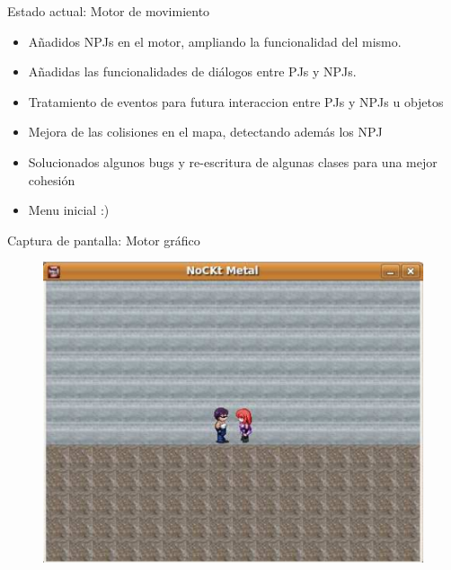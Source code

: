 \documentclass[9pt,xcolor=svgnames]{beamer}
\begin{document}
   \begin{frame}{Estado actual: Motor de movimiento}
   \transdissolve

    \begin{itemize}
     \item Añadidos NPJs en el motor, ampliando la funcionalidad del mismo.
     \item Añadidas las funcionalidades de diálogos entre PJs y NPJs.
     \item Tratamiento de eventos para futura interaccion entre PJs y
	   NPJs u objetos
     \item Mejora de las colisiones en el mapa, detectando además los NPJ
     \item Solucionados algunos bugs y re-escritura de algunas clases
	   para una mejor cohesión
     \item Menu inicial :)
    \end{itemize}
   \end{frame}


   \begin{frame}{Captura de pantalla: Motor gráfico}
   \transdissolve

   \begin{figure}[t]
    \includegraphics[scale=0.35]{./Imagenes/movimiento.pdf}
   \end{figure}    
   \end{frame}
\end{document}
